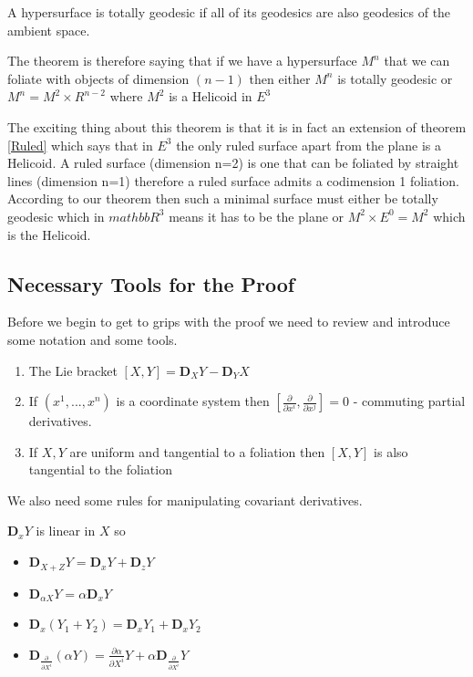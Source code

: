 \begin{definition}
A hypersurface is totally geodesic if all of its geodesics are also geodesics of the ambient space.
\end{definition}

The theorem is therefore saying that if we have a hypersurface $M^n$ that we can foliate with objects of dimension $(n-1)$ then either $M^n$ is totally geodesic or $M^n = M^2 \times R^{n-2}$ where $M^2$ is a Helicoid in $E^3$

The exciting thing about this theorem is that it is in fact an extension of theorem \ref{Ruled} which says that in $E^3$ the only ruled surface apart from the plane is a Helicoid. A ruled surface (dimension n=2) is one that can be foliated by straight lines (dimension n=1) therefore a ruled surface admits a codimension 1 foliation. According to our theorem then such a minimal surface must either be totally geodesic which in $mathbb R^3$ means it has to be the plane or $M^2 \times E^0 = M^2$ which is the Helicoid.


\subsection{Necessary Tools for the Proof}
Before we begin to get to grips with the proof we need to review and introduce some notation and some tools.

\begin{enumerate}
	\item The Lie bracket $[X,Y] = \mathbf D_X Y - \mathbf D_Y X$
	\item If $(x^1,...,x^n)$ is a coordinate system then $\left[ \frac{\partial}{\partial x^i},\frac{\partial}{\partial x^j} \right] = 0$ - commuting partial derivatives.
	\item If $X,Y$ are uniform and tangential to a foliation then $[X,Y]$ is also tangential to the foliation
\end{enumerate}

We also need some rules for manipulating covariant derivatives.

$\mathbf D_x Y$ is linear in $X$ so
\begin{itemize}
	\item $\mathbf D_{X+Z}Y = \mathbf D_x Y + \mathbf D_z Y$
	\item $\mathbf D_{\alpha X}Y = \alpha \mathbf D_x Y$
	\item $\mathbf D_x(Y_1+Y_2)=\mathbf D_x Y_1 + \mathbf D_x Y_2$
	\item $\mathbf D_{\frac{\partial}{\partial X^i}} (\alpha Y) = \frac{\partial \alpha}{\partial X^i} Y + \alpha \mathbf D_{\frac{\partial}{\partial X^i}} Y$
\end{itemize}

